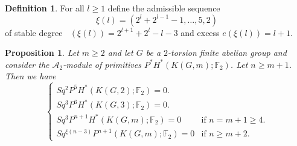 \documentclass{conm-p-l}
\newtheorem{prop}[thm]{Proposition}
\theoremstyle{definition}
\newtheorem{defn}[thm]{Definition}
\DeclareMathOperator{\degst}{deg_{st}}
\newcommand{\F}{\mathbb{F}}
\newcommand{\A}{\mathcal{A}}
\renewcommand{\geq}{\geqslant}
\begin{document}
\begin{defn}
For all $l\geq1$ define the admissible sequence $$\xi(l)=(2^l+2^{l-1}-1,\dots,5,2)$$ of stable degree $\degst(\xi(l))=2^{l+1}+2^l-l-3$ and excess $e(\xi(l))=l+1$.
\end{defn}

\begin{prop}\label{p:action}
Let $m\geq2$ and let $G$ be a $2$-torsion finite abelian group and consider the $\A_2$-module of primitives $P^*H^*(K(G,m);\F_2)$. Let $n\geq m+1$. Then we have
$$
\begin{cases}
Sq^2P^5H^*(K(G,2);\F_2)=0.\\
Sq^3P^6H^*(K(G,3);\F_2)=0.\\
Sq^{3}P^{n+1}H^*(K(G,m);\F_2)=0 &\text{if $n=m+1\geq4$.}\\
Sq^{\xi(n-3)}P^{n+1}(K(G,m);\F_2)=0 &\text{if $n\geq m+2$.}
\end{cases}
$$
\end{prop}
\end{document}
